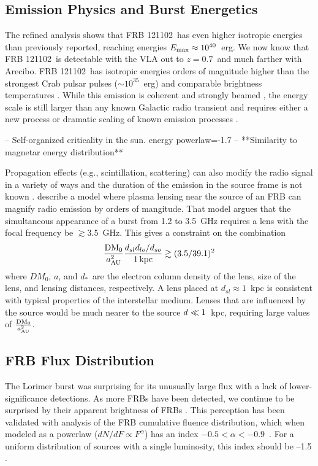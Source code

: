 \documentclass[twocolumn]{aastex61}
\newcommand{\frb}{FRB 121102}
\begin{document}
\subsection{Emission Physics and Burst Energetics}
The refined analysis shows that \frb\ has even higher isotropic energies than previously reported, reaching energies $E_{\rm{max}}\approx10^{40}$\ erg. We now know that \frb\ is detectable with the VLA out to $z=0.7$\ and much farther with Arecibo. \frb\ has isotropic energies orders of magnitude higher than the strongest Crab pulsar pulses ($\sim10^{35}$~erg) and comparable brightness temperatures \citep[$T_b^{\rm{Crab}}\sim10^{41}$~K versus $T_b^{\rm{FRB 121102}}\sim10^{38}$~K;][]{2003Natur.422..141H,2014PhRvD..89j3009K}. While this emission is coherent and strongly beamed \citep{2016Natur.531..202S, WEIRD}, the energy scale is still larger than any known Galactic radio transient and requires either a new process or dramatic scaling of known emission processes \citep{2016MNRAS.462..941L, 2016MNRAS.457..232C}.

-- Self-organized criticality in the sun. energy powerlaw=-1.7 \citep{2011SoPh..274...99A}
-- **Similarity to magnetar energy distribution**

Propagation effects (e.g., scintillation, scattering) can also modify the radio signal in a variety of ways and the duration of the emission in the source frame is not known \citep{2016arXiv160505890C}. \citet{CORDES} describe a model where plasma lensing near the source of an FRB can magnify radio emission by orders of mangitude. That model argues that the simultaneous appearance of a burst from 1.2 to 3.5~GHz requires a lens with the focal frequency be $\gtrsim 3.5$~GHz. This gives a constraint on the combination 
$$\frac{\rm DM_0}{a_{\rm AU}^2} \frac{d_{sl}d_{lo}/d_{so}}{1\, \rm kpc} \gtrsim (3.5 / 39.1)^2$$
where $DM_0$, $a$, and $d_*$\ are the electron column density of the lens, size of the lens, and lensing distances, respectively. A lens placed at $d_{sl}\approx1$~kpc is consistent with typical properties of the interstellar medium. Lenses that are influenced by the source would be much nearer to the source $d_{\sl} \ll 1$~kpc, requiring large values of $\frac{\rm DM_0}{a_{\rm AU}^2}$.

\subsection{FRB Flux Distribution}
The Lorimer burst was surprising for its unusually large flux with a lack of lower-significance detections. As more FRBs have been detected, we continue to be surprised by their apparent brightness of FRBs \citep{2016arXiv161105758R}. This perception has been validated with analysis of the FRB cumulative fluence distribution, which when modeled as a powerlaw ($dN/dF \propto F^{\alpha}$) has an index $-0.5<\alpha<-0.9$\ \citep{2016ApJ...830...75V, 2016arXiv160206099L, 2016arXiv161100458L}. For a uniform distribution of sources with a single luminosity, this index should be --1.5 \citep[the ``Euclidean'' distribution, e.g.,][]{2016MNRAS.462..941L}.
\end{document}
